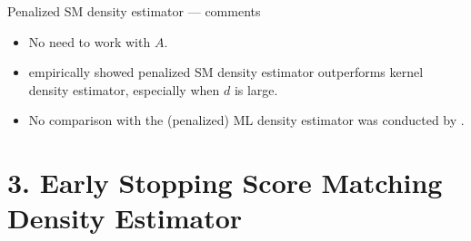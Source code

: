 \documentclass[aspectratio=169,xcolor=dvipsnames]{beamer}
\newcommand{\SM}{\mathrm{SM}}
\begin{document}
\begin{frame}{Penalized SM density estimator --- comments}

	
	\begin{itemize}
		\item No need to work with $A$. 
		\vspace{5pt}
		\item \textcite{Sriperumbudur-density-estimation-inf-exp-family} empirically showed penalized SM density estimator outperforms kernel density estimator, especially when $d$ is large. 
		\vspace{5pt}
		\item No comparison with the (penalized) ML density estimator was conducted by \textcite{Sriperumbudur-density-estimation-inf-exp-family}. 
	\end{itemize}
	
\end{frame}


\section{3. Early Stopping Score Matching Density Estimator}
\end{document}
